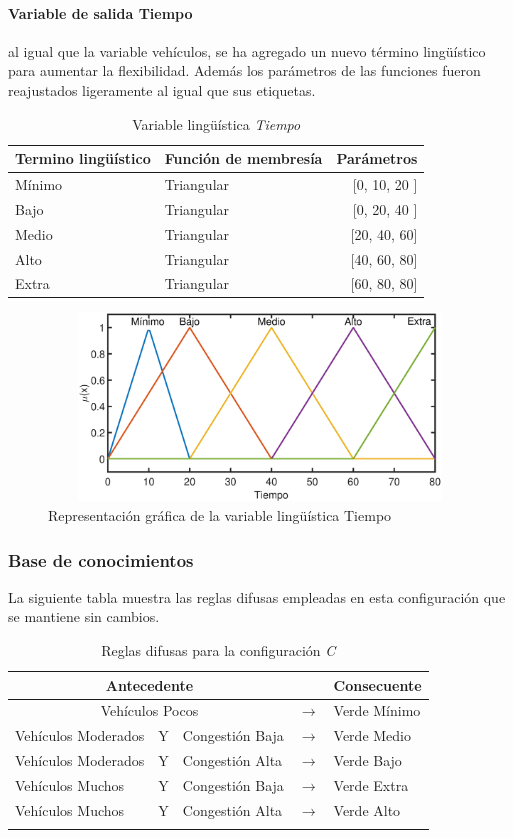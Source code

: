 \pagebreak
\paragraph{Variable de salida Tiempo} al igual que la variable vehículos, se ha agregado un nuevo término lingüístico para aumentar la flexibilidad. Además los parámetros de las funciones fueron reajustados ligeramente al igual que sus etiquetas.

\begin{table}[!h]
	\centering
	\begin{tabular}{llr} \toprule
		Termino lingüístico & Función de membresía & Parámetros \\ \midrule
		Mínimo & Triangular & [0, 10, 20 ] \\
		Bajo & Triangular & [0, 20, 40 ] \\
		Medio & Triangular & [20, 40, 60] \\
		Alto & Triangular & [40, 60, 80] \\
		Extra & Triangular & [60, 80, 80] \\ \bottomrule
	\end{tabular}
	\caption{Variable lingüística \textit{Tiempo}}
\end{table}

\begin{figure}[H]
	\centering
	\includegraphics[height=5cm, width=12cm]{Variables/ConfigC_output1.eps}
	\caption[Gráfica variable lingüística tiempo - C]{Representación gráfica de la variable lingüística Tiempo}
\end{figure}

\subsubsection{Base de conocimientos}
La siguiente tabla muestra las reglas difusas empleadas en esta configuración que se mantiene sin cambios.
\begin{longtable}[c]{lclcl} \toprule
	\multicolumn{3}{c}{Antecedente} & & Consecuente \\ \midrule
	\multicolumn{3}{c}{Vehículos Pocos} & $\rightarrow$ & Verde Mínimo \\
	Vehículos Moderados & Y & Congestión Baja& $\rightarrow$ & Verde Medio \\
	Vehículos Moderados & Y & Congestión Alta& $\rightarrow$ & Verde Bajo \\
	Vehículos Muchos &Y& Congestión Baja& $\rightarrow$ & Verde Extra \\
	Vehículos Muchos &Y& Congestión Alta& $\rightarrow$ & Verde Alto \\ \hline
	\caption{Reglas difusas para la configuración \textit{C}}
\end{longtable}

